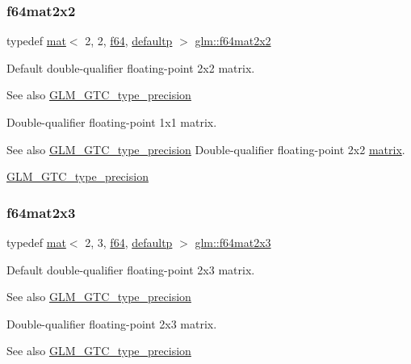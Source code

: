 \subsubsection{\texorpdfstring{f64mat2x2}{f64mat2x2}}
{\footnotesize\ttfamily typedef \hyperlink{structglm_1_1mat}{mat}$<$ 2, 2, \hyperlink{group__gtc__type__precision_ga2bba392e555124b36cde6abba349bab3}{f64}, \hyperlink{namespaceglm_a36ed105b07c7746804d7fdc7cc90ff25a9d21ccd8b5a009ec7eb7677befc3bf51}{defaultp} $>$ \hyperlink{group__gtc__type__precision_gae18de078e2885803ceda215c6e04a08a}{glm\+::f64mat2x2}}

Default double-\/qualifier floating-\/point 2x2 matrix. \begin{DoxySeeAlso}{See also}
\hyperlink{group__gtc__type__precision}{G\+L\+M\+\_\+\+G\+T\+C\+\_\+type\+\_\+precision}
\end{DoxySeeAlso}
Double-\/qualifier floating-\/point 1x1 matrix. \begin{DoxySeeAlso}{See also}
\hyperlink{group__gtc__type__precision}{G\+L\+M\+\_\+\+G\+T\+C\+\_\+type\+\_\+precision} Double-\/qualifier floating-\/point 2x2 \hyperlink{_s_d_l__opengl__glext_8h_a7b24a3f2f56eb1244ae69dacb4fecb6f}{matrix}. 

\hyperlink{group__gtc__type__precision}{G\+L\+M\+\_\+\+G\+T\+C\+\_\+type\+\_\+precision} 
\end{DoxySeeAlso}
\mbox{\label{group__gtc__type__precision_ga7816d266eaf216e384c3c6d1e570b9f3}} 
\subsubsection{\texorpdfstring{f64mat2x3}{f64mat2x3}}
{\footnotesize\ttfamily typedef \hyperlink{structglm_1_1mat}{mat}$<$ 2, 3, \hyperlink{group__gtc__type__precision_ga2bba392e555124b36cde6abba349bab3}{f64}, \hyperlink{namespaceglm_a36ed105b07c7746804d7fdc7cc90ff25a9d21ccd8b5a009ec7eb7677befc3bf51}{defaultp} $>$ \hyperlink{group__gtc__type__precision_ga7816d266eaf216e384c3c6d1e570b9f3}{glm\+::f64mat2x3}}

Default double-\/qualifier floating-\/point 2x3 matrix. \begin{DoxySeeAlso}{See also}
\hyperlink{group__gtc__type__precision}{G\+L\+M\+\_\+\+G\+T\+C\+\_\+type\+\_\+precision}
\end{DoxySeeAlso}
Double-\/qualifier floating-\/point 2x3 matrix. \begin{DoxySeeAlso}{See also}
\hyperlink{group__gtc__type__precision}{G\+L\+M\+\_\+\+G\+T\+C\+\_\+type\+\_\+precision} 
\end{DoxySeeAlso}
\mbox{\label{group__gtc__type__precision_gae075a2083e1801ada5c99c91f79eb6ed}} 
